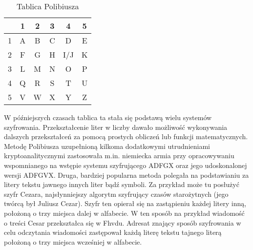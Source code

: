 \documentclass[a4paper]{article}
\begin{document}
\begin{table}[h]
\centering\caption{Tablica Polibiusza}\label{tabela 1}
\begin{tabular}{| c | c | c | c | c | c |}
\hline
 & 1 & 2 & 3 & 4 & 5 \\
\hline
1 & A & B & C & D & E \\
\hline
2 & F & G & H & I/J & K \\
\hline
3 & L & M & N & O & P \\
\hline
4 & Q & R & S & T & U \\
\hline
5 & V & W & X & Y & Z \\
\hline
\end{tabular}
\end{table}
\noindent W późniejszych czasach tablica ta stała się podstawą wielu systemów szyfrowania. Przekształcenie
liter w liczby dawało możliwość wykonywania dalszych przekształceń za pomocą prostych obliczeń
lub funkcji matematycznych. Metodę Polibiusza uzupełnioną kilkoma dodatkowymi utrudnieniami
kryptoanalitycznymi zastosowała m.in. niemiecka armia przy opracowywaniu wspomnianego na
wstępie systemu szyfrującego ADFGX oraz jego udoskonalonej wersji ADFGVX.
Druga, bardziej popularna metoda polegała na podstawianiu za litery tekstu jawnego innych liter
bądź symboli. Za przykład może tu posłużyć szyfr Cezara, najsłynniejszy algorytm szyfrujący
czasów starożytnych (jego twórcą był Juliusz Cezar). Szyfr ten opierał się na zastąpieniu każdej
litery inną, położoną o trzy miejsca dalej w alfabecie. W ten sposób na przykład wiadomość o treści
Cesar przekształca się w Fhvdu. Adresat znający sposób szyfrowania w celu odczytania wiadomości
zastępował każdą literę tekstu tajnego literą położoną o trzy miejsca wcześniej w alfabecie.
\end{document}
